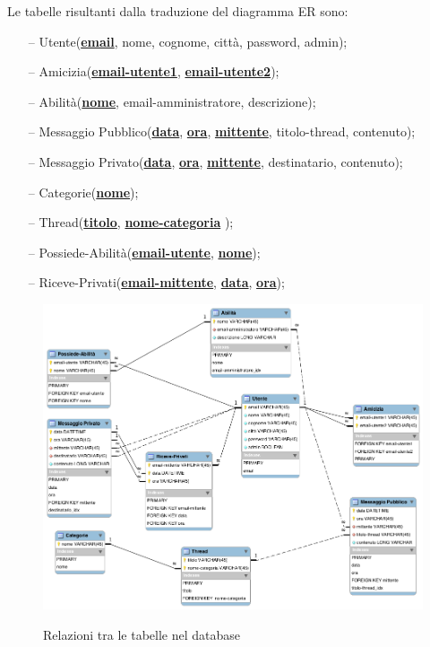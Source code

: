 Le tabelle risultanti dalla traduzione del diagramma ER sono:
\begin{itemize}
\item[--]Utente(\underline{{\bfseries email}}, nome, cognome, città, password, admin);\\
\item[--]Amicizia(\underline{{\bfseries email-utente1}}, \underline{{\bfseries email-utente2}});\\
\item[--]Abilità(\underline{{\bfseries nome}}, email-amministratore, descrizione);\\
\item[--]Messaggio Pubblico(\underline{{\bfseries data}}, \underline{{\bfseries ora}}, \underline{{\bfseries mittente}}, titolo-thread, contenuto);\\
\item[--]Messaggio Privato(\underline{{\bfseries data}}, \underline{{\bfseries ora}}, \underline{{\bfseries mittente}}, destinatario, contenuto);\\
\item[--]Categorie(\underline{{\bfseries nome}});\\
\item[--]Thread(\underline{{\bfseries titolo}}, \underline{{\bfseries nome-categoria}} );\\
\item[--]Possiede-Abilità(\underline{{\bfseries email-utente}}, \underline{{\bfseries nome}});\\
\item[--]Riceve-Privati(\underline{{\bfseries email-mittente}}, \underline{{\bfseries data}}, \underline{{\bfseries ora}});
\end{itemize}

\begin{figure} 
\includegraphics[scale=0.55]{GraficoRelazionale.png} \\
\caption{\label{RelazioniTabelle} Relazioni tra le tabelle nel database}
\end{figure}

